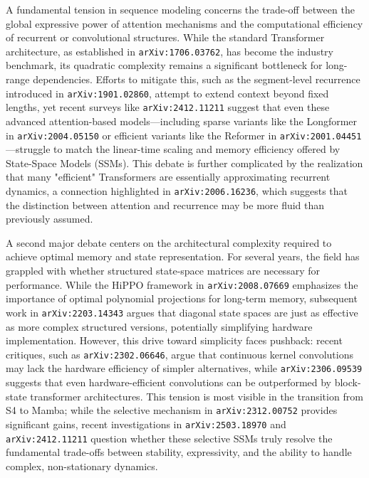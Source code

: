 \documentclass[11pt]{article}
\begin{document}
A fundamental tension in sequence modeling concerns the trade-off between the global expressive power of attention mechanisms and the computational efficiency of recurrent or convolutional structures. While the standard Transformer architecture, as established in \texttt{arXiv:1706.03762}, has become the industry benchmark, its quadratic complexity remains a significant bottleneck for long-range dependencies. Efforts to mitigate this, such as the segment-level recurrence introduced in \texttt{arXiv:1901.02860}, attempt to extend context beyond fixed lengths, yet recent surveys like \texttt{arXiv:2412.11211} suggest that even these advanced attention-based models—including sparse variants like the Longformer in \texttt{arXiv:2004.05150} or efficient variants like the Reformer in \texttt{arXiv:2001.04451}—struggle to match the linear-time scaling and memory efficiency offered by State-Space Models (SSMs). This debate is further complicated by the realization that many "efficient" Transformers are essentially approximating recurrent dynamics, a connection highlighted in \texttt{arXiv:2006.16236}, which suggests that the distinction between attention and recurrence may be more fluid than previously assumed.

A second major debate centers on the architectural complexity required to achieve optimal memory and state representation. For several years, the field has grappled with whether structured state-space matrices are necessary for performance. While the HiPPO framework in \texttt{arXiv:2008.07669} emphasizes the importance of optimal polynomial projections for long-term memory, subsequent work in \texttt{arXiv:2203.14343} argues that diagonal state spaces are just as effective as more complex structured versions, potentially simplifying hardware implementation. However, this drive toward simplicity faces pushback: recent critiques, such as \texttt{arXiv:2302.06646}, argue that continuous kernel convolutions may lack the hardware efficiency of simpler alternatives, while \texttt{arXiv:2306.09539} suggests that even hardware-efficient convolutions can be outperformed by block-state transformer architectures. This tension is most visible in the transition from S4 to Mamba; while the selective mechanism in \texttt{arXiv:2312.00752} provides significant gains, recent investigations in \texttt{arXiv:2503.18970} and \texttt{arXiv:2412.11211} question whether these selective SSMs truly resolve the fundamental trade-offs between stability, expressivity, and the ability to handle complex, non-stationary dynamics.
\end{document}
